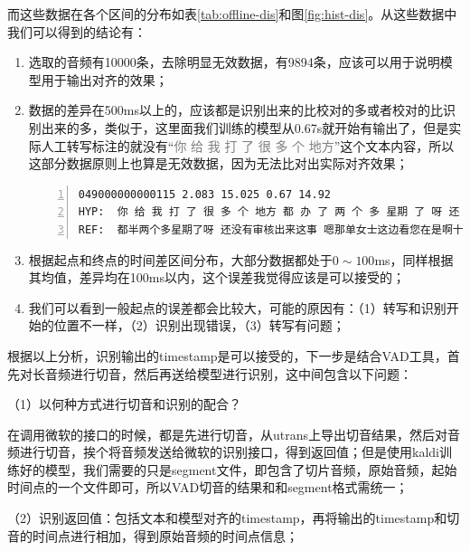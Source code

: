 而这些数据在各个区间的分布如表\ref{tab:offline-dis}和图\ref{fig:hist-dis}。从这些数据中我们可以得到的结论有：
\begin{enumerate}
	\item 选取的音频有10000条，去除明显无效数据，有9894条，应该可以用于说明模型用于输出对齐的效果；
	\item 数据的差异在500ms以上的，应该都是识别出来的比校对的多或者校对的比识别出来的多，类似于，这里面我们训练的模型从0.67s就开始有输出了，但是实际人工转写标注的就没有“\textcolor{gray}{你 给 我 打 了 很 多 个 地方}”这个文本内容，所以这部分数据原则上也算是无效数据，因为无法比对出实际对齐效果；
	\begin{lstlisting}[language=shell, numbers=left, 
         numberstyle=\tiny,keywordstyle=\color{blue!70},
         commentstyle=\color{red!50!green!50!blue!50},frame=shadowbox,
         rulesepcolor=\color{red!20!green!20!blue!20},basicstyle=\ttfamily]
049000000000115 2.083 15.025 0.67 14.92
HYP:  你 给 我 打 了 很 多 个 地方 都 办 了 两 个 多 星期 了 呀 还 没有 审核 出来 这 是 嗯 那 这样 女士 这 边 看 到 您 的 是 呃 十一月 五 号 申请 的 今天 是 十八 号 也就是说 十三 天 左右 您 这边 耐心 等待 一下 后续 的 话 咱们
REF:  都半两个多星期了呀 还没有审核出来这事 嗯那单女士这边看您在是啊十一月的五号申请的 今天是十八号 也就是说十三天左右 您这两天耐心等待一下后续的话咱们
	\end{lstlisting}
	\item 根据起点和终点的时间差区间分布，大部分数据都处于$0\sim100$ms，同样根据其均值，差异均在100ms以内，这个误差我觉得应该是可以接受的；
	\item 我们可以看到一般起点的误差都会比较大，可能的原因有：（1）转写和识别开始的位置不一样，（2）识别出现错误，（3）转写有问题；
\end{enumerate}

根据以上分析，识别输出的timestamp是可以接受的，下一步是结合VAD工具，首先对长音频进行切音，然后再送给模型进行识别，这中间包含以下问题：

（1）以何种方式进行切音和识别的配合？

在调用微软的接口的时候，都是先进行切音，从utrans上导出切音结果，然后对音频进行切音，挨个将音频发送给微软的识别接口，得到返回值；但是使用kaldi训练好的模型，我们需要的只是segment文件，即包含了切片音频，原始音频，起始时间点的一个文件即可，所以VAD切音的结果和和segment格式需统一；

（2）识别返回值：包括文本和模型对齐的timestamp，再将输出的timestamp和切音的时间点进行相加，得到原始音频的时间点信息；

